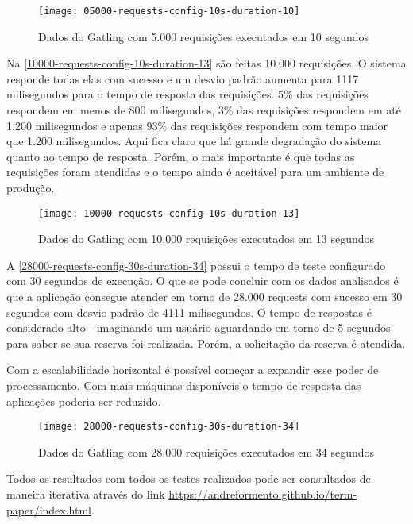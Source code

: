 \begin{figure}[h]
  \texttt{[image: 05000-requests-config-10s-duration-10]}
  \caption{Dados do Gatling com 5.000 requisições executados em 10 segundos}
  \label{05000-requests-config-10s-duration-10}
\end{figure}

Na \autoref{10000-requests-config-10s-duration-13} são feitas 10.000 requisições.
O sistema responde todas elas com sucesso e um desvio padrão aumenta para 1117 milisegundos
para o tempo de resposta das requisições.
5\% das requisições respondem em menos de 800 milisegundos, 3\% das requisições
respondem em até 1.200 milisegundos e apenas 93\% das requisições
respondem com tempo maior que 1.200 milisegundos. Aqui fica claro que há grande
degradação do sistema quanto ao tempo de resposta. Porém, o mais importante
é que todas as requisições foram atendidas e o tempo ainda é aceitável para
um ambiente de produção.

\begin{figure}[h]
  \texttt{[image: 10000-requests-config-10s-duration-13]}
  \caption{Dados do Gatling com 10.000 requisições executados em 13 segundos}
  \label{10000-requests-config-10s-duration-13}
\end{figure}

A \autoref{28000-requests-config-30s-duration-34} possui o tempo de teste configurado
com 30 segundos de execução.
O que se pode concluir com os dados analisados é que a aplicação consegue atender
em torno de 28.000 requests com sucesso em 30 segundos com desvio padrão de
4111 milisegundos.
O tempo de respostas é considerado alto - imaginando um usuário aguardando em
torno de 5 segundos para saber se sua reserva foi realizada.
Porém, a solicitação da reserva é atendida.

Com a escalabilidade horizontal é possível começar a expandir esse poder de processamento.
Com mais máquinas disponíveis o tempo de resposta das aplicações poderia ser reduzido.

\begin{figure}[h]
  \texttt{[image: 28000-requests-config-30s-duration-34]}
  \caption{Dados do Gatling com 28.000 requisições executados em 34 segundos}
  \label{28000-requests-config-30s-duration-34}
\end{figure}

Todos os resultados com todos os testes realizados pode ser consultados de maneira
iterativa através do link \url{https://andreformento.github.io/term-paper/index.html}.
